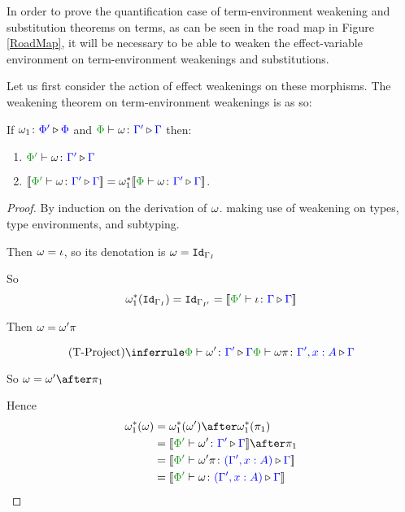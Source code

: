 \documentclass{Report}
\begin{document}
In order to prove the quantification case of term-environment weakening and substitution theorems on terms, as can be seen in the road map in Figure \ref{RoadMap}, it will be necessary to be able to weaken the effect-variable environment on term-environment weakenings and substitutions.

Let us first consider the action of effect weakenings on these morphisms. The weakening theorem on term-environment weakenings is as so:



\begin{framed}
    \begin{theorem}\label{EffectWeakeningOnTermWeakening}
        If $\omega_1 \colon {\color{blue}\Phi'} \triangleright {\color {blue} \Phi}$ and $\pewrel{\w}{\G'}{\G}$ then:
        \begin{enumerate}[label=\roman*.]
            \item $\ewrel{\P'}{\w}{\G'}{\G}$
            \item $\deno{\ewrel{\P'}{\w}{\G'}{\G}} = \w_1\star\deno{\pewrel{\w}{\G'}{\G}}$.
        \end{enumerate} 
    \end{theorem}
    
    \begin{proof}
        By induction on the derivation of $\omega$. making use of weakening on types, type environments, and subtyping.
    
        \case{\tid}
        Then $\omega = \iota$, so its denotation is $\omega = \texttt{Id}_{\Gamma_I}$
        
        So
        \begin{equation}
          \w_1\star(\Id{\G_I}) = \Id{\G_{I'}} = \deno{\ewrel{\P'}{\i}{\G}{\G}}  
        \end{equation}
        
        \case{\tproject}
        Then $\omega = \omega'\pi$
        
        \begin{equation}
            \ntreeruleI{\tproject}{\ewrel{\P}{\w'}{\G'}{\G}}{\ewrel{\P}{\w\pi}{\G',x:A}{\G}}
        \end{equation}
        
        So $\w = \w'\after\p$
        
        Hence
        \begin{align*}
            \w_1\star(\w) &= \w_1\star(\w')\after\w_1\star(\p)\\
            & = \deno{\ewrel{\P'}{\w'}{\G'}{\G}}\after\p\\
            & = \deno{\ewrel{\P'}{\w'\pi}{(\G',x:A)}{\G}}\\
            & = \deno{\ewrel{\P'}{\w}{(\G', x:A)}{\G}}
        \end{align*}
        

\end{proof}
\end{framed}
\end{document}
